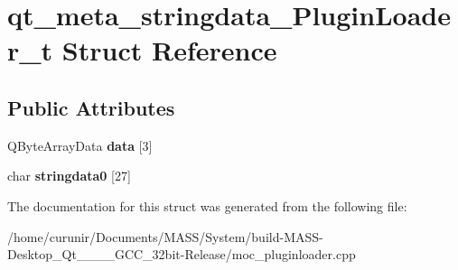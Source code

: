\hypertarget{structqt__meta__stringdata___plugin_loader__t}{}\section{qt\+\_\+meta\+\_\+stringdata\+\_\+\+Plugin\+Loader\+\_\+t Struct Reference}
\label{structqt__meta__stringdata___plugin_loader__t}
\subsection*{Public Attributes}
\begin{DoxyCompactItemize}
\item 
Q\+Byte\+Array\+Data {\bfseries data} \mbox{[}3\mbox{]}\hypertarget{structqt__meta__stringdata___plugin_loader__t_ab96f60b7624ed3979315a61564d29334}{}\label{structqt__meta__stringdata___plugin_loader__t_ab96f60b7624ed3979315a61564d29334}

\item 
char {\bfseries stringdata0} \mbox{[}27\mbox{]}\hypertarget{structqt__meta__stringdata___plugin_loader__t_a403d50c87ad2f0cf3f33eed77ac2d166}{}\label{structqt__meta__stringdata___plugin_loader__t_a403d50c87ad2f0cf3f33eed77ac2d166}

\end{DoxyCompactItemize}


The documentation for this struct was generated from the following file\+:\begin{DoxyCompactItemize}
\item 
/home/curunir/\+Documents/\+M\+A\+S\+S/\+System/build-\/\+M\+A\+S\+S-\/\+Desktop\+\_\+\+Qt\+\_\+\_\+\_\+\_\+\+G\+C\+C\+\_\+32bit-\/\+Release/moc\+\_\+pluginloader.\+cpp\end{DoxyCompactItemize}

